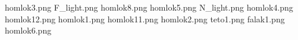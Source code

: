 homlok3.png
F_light.png
homlok8.png
homlok5.png
N_light.png
homlok4.png
homlok12.png
homlok1.png
homlok11.png
homlok2.png
teto1.png
falak1.png
homlok6.png
